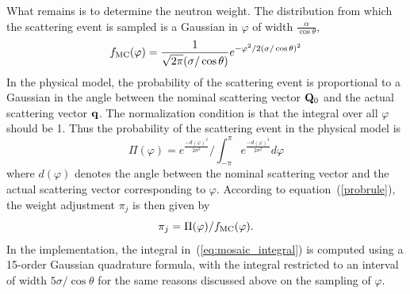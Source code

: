 What remains is to determine the neutron weight. The distribution from
which the scattering event is sampled is a Gaussian in $\varphi$ of
width $\frac{\alpha}{\cos\theta}$,
\begin{equation}
    f_{\rm MC}(\varphi) = \frac{1}{\sqrt{2\pi}(\sigma/\cos\theta)}
            e^{-\varphi^2/2(\sigma/\cos\theta)^2}
\end{equation}
In the physical model, the probability of the scattering event is
proportional to a Gaussian in the angle between the nominal scattering
vector ${\bf Q}_0$ and the actual scattering vector ${\bf q}$. The
normalization condition is that the integral over all $\varphi$ should
be 1. Thus the probability of the scattering event in the physical model
is
\begin{equation}
  \label{eq:mosaic_integral}
  \Pi(\varphi) = e^{\frac{-d(\varphi)^2}{2\sigma^2}} /
   \int_{-\pi}^{\pi} e^{\frac{-d(\varphi)^2}{2\sigma^2}} d\varphi
\end{equation}
where $d(\varphi)$ denotes the angle between the nominal scattering
vector and the actual scattering vector corresponding to $\varphi$.
According to equation~(\ref{probrule}), the weight adjustment $\pi_j$ is
then given by
\begin{equation}
\pi_j = \Pi(\varphi) / f_{\rm MC}(\varphi).
\end{equation}
In the implementation, the integral in~(\ref{eq:mosaic_integral}) is computed
using a 15-order Gaussian quadrature formula, with the integral
restricted to an interval of width $5\sigma/\cos\theta$ for the same
reasons discussed above on the sampling of $\varphi$.
